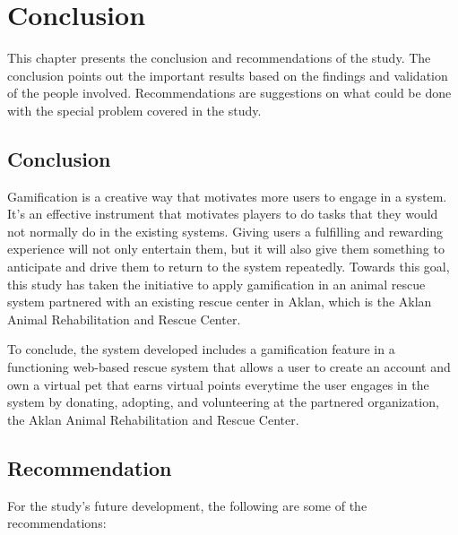\chapter{Conclusion}
This chapter presents the conclusion and recommendations of the study. The conclusion points out the important results based on the findings and validation of the people involved. Recommendations are suggestions on what could be done with the special problem covered in the study.

\section{Conclusion}

Gamification is a creative way that motivates more users to engage in a system. It's an effective instrument that motivates players to do tasks that they would not normally do in the existing systems. Giving users a fulfilling and rewarding experience will not only entertain them, but it will also give them something to anticipate and drive them to return to the system repeatedly. Towards this goal, this study has taken the initiative to apply gamification in an animal rescue system partnered with an existing rescue center in Aklan, which is the Aklan Animal Rehabilitation and Rescue Center.

To conclude, the system developed includes a gamification feature in a functioning web-based rescue system that allows a user to create an account and own a virtual pet that earns virtual points everytime the user engages in the system by donating, adopting, and volunteering at the partnered organization, the Aklan Animal Rehabilitation and Rescue Center. 

\section{Recommendation}

For the study's future development, the following are some of the recommendations:

